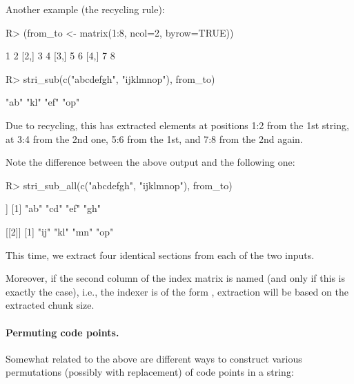 \documentclass[nojss]{jss}
\begin{document}
\noindent Another example (the recycling rule):
\fi

\begin{Schunk}
\begin{Sinput}
R> (from_to <- matrix(1:8, ncol=2, byrow=TRUE))
\end{Sinput}
\begin{Soutput}
     [,1] [,2]
[1,]    1    2
[2,]    3    4
[3,]    5    6
[4,]    7    8
\end{Soutput}
\begin{Sinput}
R> stri_sub(c("abcdefgh", "ijklmnop"), from_to)
\end{Sinput}
\begin{Soutput}
[1] "ab" "kl" "ef" "op"
\end{Soutput}
\end{Schunk}

\noindent
Due to recycling, this has extracted
elements at positions 1:2 from the 1st string,
at 3:4 from the 2nd one, 5:6 from the 1st, and 7:8 from the 2nd again.

Note the difference between the above output and the following one:

\begin{Schunk}
\begin{Sinput}
R> stri_sub_all(c("abcdefgh", "ijklmnop"), from_to)
\end{Sinput}
\begin{Soutput}
[[1]]
[1] "ab" "cd" "ef" "gh"

[[2]]
[1] "ij" "kl" "mn" "op"
\end{Soutput}
\end{Schunk}

This time, we extract four identical sections from each of the two inputs.


\medskip
Moreover, if the second column of the index matrix is named
 (and only if this is exactly the case),
i.e., the indexer is of the form ,
extraction will be based on the extracted chunk size.




\ifnotJSSversion
\paragraph{Permuting code points.}
Somewhat related to the above are different ways to construct
various permutations (possibly with replacement) of code points in a string:
\end{document}
